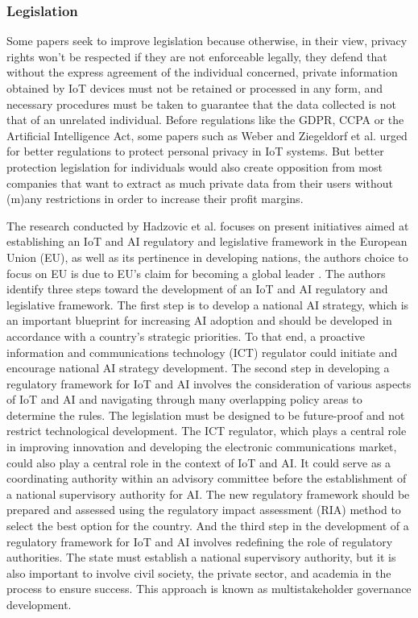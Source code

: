 \subsubsection{Legislation}

Some papers seek to improve legislation \cite{WEBER2015618, FabianoInternet}
because otherwise, in their view, privacy rights won't be respected if they
are not enforceable legally, they defend that without the express agreement
of the individual concerned, private information obtained by IoT devices
must not be retained or processed in any form, and necessary procedures
must be taken to guarantee that the data collected is not that of an unrelated
individual. Before regulations like the GDPR, CCPA or the Artificial Intelligence
Act, some papers such as Weber \cite{weber2010internet} and Ziegeldorf et al. \cite{ziegeldorf2014privacy}
urged for better regulations to protect personal privacy in IoT systems.
But better protection legislation for individuals would also create opposition
from most companies that want to extract as much private data from their
users without (m)any restrictions in order to increase their profit margins.

The research conducted by Hadzovic et al. \cite{hadzovic2023path} focuses on
present initiatives aimed at establishing an IoT and AI regulatory and legislative
framework in the European Union (EU), as well as its pertinence in developing nations, the authors
choice to focus on EU is due to EU's claim for becoming a global leader \cite{european2021europe}. The authors
identify three steps toward the development of an IoT and AI regulatory and
legislative framework. The first step is to develop a national AI strategy, which
is an important blueprint for increasing AI adoption and should be developed
in accordance with a country's strategic priorities. To that end, a proactive
information and communications technology (ICT) regulator could initiate and encourage
national AI strategy development. The second step in developing a regulatory
framework for IoT and AI involves the consideration of various aspects of IoT
and AI and navigating through many overlapping policy areas to determine the rules.
The legislation must be designed to be future-proof and not restrict technological
development. The ICT regulator, which plays a central role in improving innovation
and developing the electronic communications market, could also play a central role
in the context of IoT and AI. It could serve as a coordinating authority within
an advisory committee before the establishment of a national supervisory authority
for AI. The new regulatory framework should be prepared and assessed using the regulatory
impact assessment (RIA) method to select the best option for the country. And the
third step in the development of a regulatory framework for IoT and AI involves
redefining the role of regulatory authorities. The state must establish a national
supervisory authority, but it is also important to involve civil society, the private
sector, and academia in the process to ensure success. This approach is known as
multistakeholder governance development.

